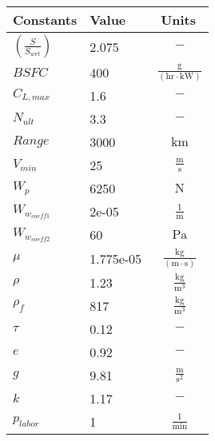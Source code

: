 {\footnotesize
\begin{longtable}{llc}
\toprule
Constants & Value & Units \\ \midrule
$(\frac{S}{S_{wet}})$ & 2.075  & $~\mathrm{-}$ \\
$BSFC$ & 400  & $~\mathrm{\tfrac{g}{\left(hr\cdot kW\right)}}$ \\
$C_{L,max}$ & 1.6  & $~\mathrm{-}$ \\
$N_{ult}$ & 3.3  & $~\mathrm{-}$ \\
$Range$ & 3000  & $~\mathrm{km}$ \\
$V_{min}$ & 25  & $~\mathrm{\tfrac{m}{s}}$ \\
$W_p$ & 6250  & $~\mathrm{N}$ \\
$W_{w_{coeff1}}$ & 2e-05  & $~\mathrm{\tfrac{1}{m}}$ \\
$W_{w_{coeff2}}$ & 60  & $~\mathrm{Pa}$ \\
$\mu$ & 1.775e-05  & $~\mathrm{\tfrac{kg}{\left(m\cdot s\right)}}$ \\
$\rho$ & 1.23  & $~\mathrm{\tfrac{kg}{m^{3}}}$ \\
$\rho_f$ & 817  & $~\mathrm{\tfrac{kg}{m^{3}}}$ \\
$\tau$ & 0.12  & $~\mathrm{-}$ \\
$e$ & 0.92  & $~\mathrm{-}$ \\
$g$ & 9.81  & $~\mathrm{\tfrac{m}{s^{2}}}$ \\
$k$ & 1.17  & $~\mathrm{-}$ \\
$p_{labor}$ & 1  & $~\mathrm{\tfrac{1}{min}}$ \\
\bottomrule
\end{longtable}}

